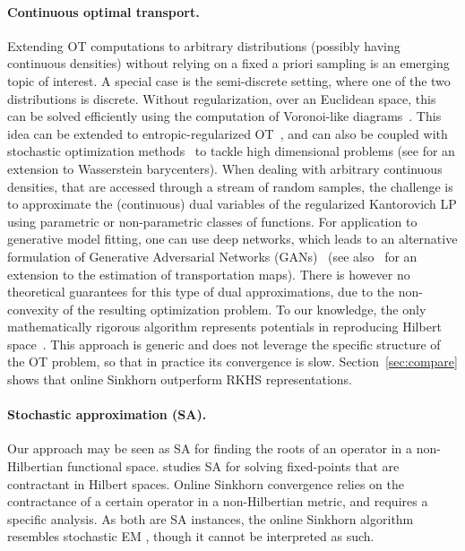 \paragraph{Continuous optimal transport.} Extending OT computations to arbitrary
distributions (possibly having continuous densities) without relying on a fixed
a priori sampling is an emerging topic of interest. A special case is the
semi-discrete setting, where one of the two distributions is discrete. Without
regularization, over an Euclidean space, this can be solved efficiently using
the computation of Voronoi-like diagrams~\citep{merigot2011multiscale}. This
idea can be extended to entropic-regularized OT~\citep{cuturi2018semidual}, and
can also be coupled with stochastic optimization
methods~\citep{2016-genevay-nips} to tackle high dimensional problems (see
 \cite{staib2017parallel} for an extension to Wasserstein barycenters). When dealing with arbitrary continuous densities, that are accessed through a
stream of random samples, the challenge is to approximate  the (continuous) dual
variables of the regularized Kantorovich LP using parametric or non-parametric
classes of functions. For application to generative model fitting, one can use
deep networks, which leads to an alternative formulation of Generative
Adversarial Networks (GANs)~\citep{arjovsky2017wgan} (see
also~\citet{seguy2018large} for an extension to the estimation of transportation
maps). There is however no theoretical guarantees for this type of dual
approximations, due to the non-convexity of the resulting optimization problem.
To our knowledge, the only mathematically rigorous algorithm represents potentials in reproducing
Hilbert space~\citep{2016-genevay-nips}. This
approach is generic and does not leverage the specific structure of the OT problem, so that in practice its convergence is slow. Section~\autoref{sec:compare} shows that online Sinkhorn outperform RKHS representations.

\paragraph{Stochastic approximation (SA).} Our approach may be seen as SA \cite{robbins_stochastic_1951} for finding the roots of an
operator in a non-Hilbertian functional space. \cite{alber_stochastic_2012} studies
SA for solving fixed-points that are contractant in Hilbert spaces. Online Sinkhorn convergence relies on the contractance of a certain operator in a non-Hilbertian metric, and requires a specific analysis. 
As both are SA instances, the online Sinkhorn algorithm resembles stochastic EM \cite{celeux_stochastic_1992}, though it cannot be interpreted as such.